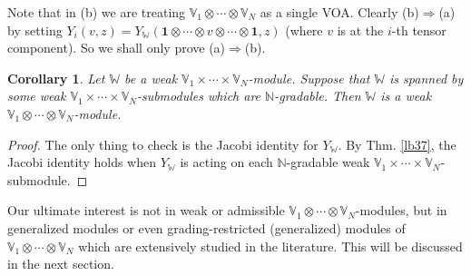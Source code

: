 \documentclass[11pt,b5paper,notitlepage]{article}
\theoremstyle{definition}
\newtheorem{rem}[df]{Remark}
\theoremstyle{plain}
\newtheorem{co}[df]{Corollary}
\newcommand{\wtd}{\widetilde}
\newcommand{\id}{\mathbf{1}}
\newcommand{\Vbb}{\mathbb V}
\newcommand{\Wbb}{\mathbb W}
\newcommand{\Nbb}{\mathbb N}
\newcommand{\<}{\left\langle}
\renewcommand{\>}{\right\rangle}
\numberwithin{equation}{subsection}
\begin{document}
Note that in (b) we are treating $\Vbb_1\otimes\cdots\otimes\Vbb_N$ as a single VOA. Clearly (b)$\Rightarrow$(a) by  setting $Y_i(v,z)=Y_\Wbb(\id\otimes\cdots\otimes v\otimes\cdots\otimes\id,z)$ (where $v$ is at the $i$-th tensor component). So we shall only prove (a)$\Rightarrow$(b). 




\begin{comment}
\begin{rem}\label{lb36}
A weak $\Vbb_1\otimes\cdots\otimes\Vbb_N$-module is clearly a weak $\Vbb_1\times\cdots\times\Vbb_N$-module. The converse is not known. Thus, even if one only wants to construct a weak $\Vbb_1\times\cdots\times\Vbb_N$-module using mutually commuting vertex operators for $\Vbb_1,\dots,\Vbb_N$, one needs a grading operator $\wtd L(0)$, or $\wtd L_1(0),\dots,\wtd L_N(0)$. We will address this issue in Sec. \ref{lb35}.
\end{rem}
\end{comment}

\begin{comment}
\begin{co}
Suppose that $\Wbb$ is a finitely-admissible $\Vbb_1\times\cdots\times\Vbb_N$-module. Then $\Wbb$ is a finitely-admissible $\Vbb_1\otimes\cdots\otimes\Vbb_N$-module.
\end{co}


\begin{proof}
This follows immediately from Thm. \ref{lb37}.
\end{proof}
\end{comment}







\begin{co}\label{lb38}
Let $\Wbb$ be a weak $\Vbb_1\times\cdots\times\Vbb_N$-module. Suppose that $\Wbb$ is spanned by some weak  $\Vbb_1\times\cdots\times\Vbb_N$-submodules which are $\Nbb$-gradable. Then $\Wbb$ is a weak $\Vbb_1\otimes\cdots\otimes\Vbb_N$-module.
\end{co}

\begin{proof}
The only thing to check is the Jacobi identity for $Y_\Wbb$. By Thm. \ref{lb37}, the Jacobi identity holds when $Y_\Wbb$ is acting on each $\Nbb$-gradable weak $\Vbb_1\times\cdots\times\Vbb_N$-submodule.
\end{proof}

Our ultimate interest is not in weak or admissible $\Vbb_1\otimes\cdots\otimes\Vbb_N$-modules, but in generalized modules or even grading-restricted (generalized) modules of $\Vbb_1\otimes\cdots\otimes\Vbb_N$ which are extensively studied in the literature. This will be discussed in the next section.
\end{document}
